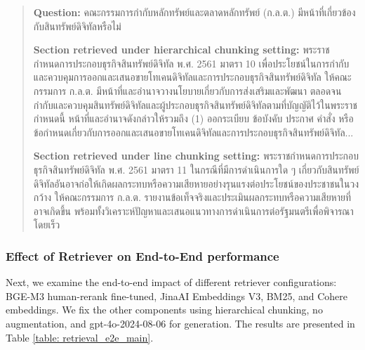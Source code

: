 \begin{quote}
    \begin{thai}
    \textbf{Question: } คณะกรรมการกำกับหลักทรัพย์และตลาดหลักทรัพย์ (ก.ล.ต.) มีหน้าที่เกี่ยวข้องกับสินทรัพย์ดิจิทัลหรือไม่
    
    \textbf{Section retrieved under hierarchical chunking setting: } พระราชกำหนดการประกอบธุรกิจสินทรัพย์ดิจิทัล พ.ศ. 2561 มาตรา 10 เพื่อประโยชน์ในการกำกับและควบคุมการออกและเสนอขายโทเคนดิจิทัลและการประกอบธุรกิจสินทรัพย์ดิจิทัล ให้คณะกรรมการ ก.ล.ต. มีหน้าที่และอำนาจวางนโยบายเกี่ยวกับการส่งเสริมและพัฒนา ตลอดจนกำกับและควบคุมสินทรัพย์ดิจิทัลและผู้ประกอบธุรกิจสินทรัพย์ดิจิทัลตามที่บัญญัติไว้ในพระราชกำหนดนี้ หน้าที่และอำนาจดังกล่าวให้รวมถึง
(1) ออกระเบียบ ข้อบังคับ ประกาศ คำสั่ง หรือข้อกำหนดเกี่ยวกับการออกและเสนอขายโทเคนดิจิทัลและการประกอบธุรกิจสินทรัพย์ดิจิทัล...

    \textbf{Section retrieved under line chunking setting: } พระราชกำหนดการประกอบธุรกิจสินทรัพย์ดิจิทัล พ.ศ. 2561 มาตรา 11 ในกรณีที่มีการดำเนินการใด ๆ เกี่ยวกับสินทรัพย์ดิจิทัลอันอาจก่อให้เกิดผลกระทบหรือความเสียหายอย่างรุนแรงต่อประโยชน์ของประชาชนในวงกว้าง ให้คณะกรรมการ ก.ล.ต. รายงานข้อเท็จจริงและประเมินผลกระทบหรือความเสียหายที่อาจเกิดขึ้น พร้อมทั้งวิเคราะห์ปัญหาและเสนอแนวทางการดำเนินการต่อรัฐมนตรีเพื่อพิจารณาโดยเร็ว 

    \end{thai}
\end{quote}

\subsubsection{Effect of Retriever on End-to-End performance}
\label{subsubsec: retriever_e2e_result}


Next, we examine the end-to-end impact of different retriever configurations: BGE-M3 human-rerank fine-tuned, JinaAI Embeddings V3, BM25, and Cohere embeddings. We fix the other components using hierarchical chunking, no augmentation, and gpt-4o-2024-08-06 for generation. The results are presented in Table \ref{table: retrieval_e2e_main}.

